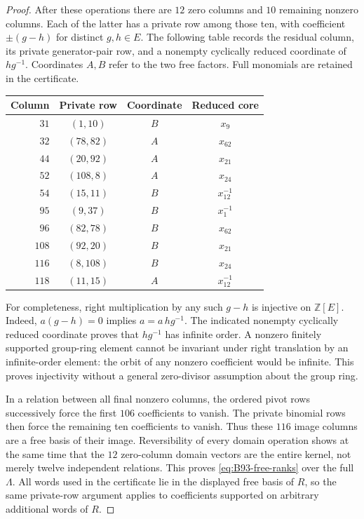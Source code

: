 \begin{proof}
After these operations there are $12$ zero columns and $10$
remaining nonzero columns. Each of the latter has a private row
among those ten, with coefficient $\pm(g-h)$ for distinct
$g,h\in E$. The following table records the residual column,
its private generator-pair row, and a nonempty cyclically reduced
coordinate of $hg^{-1}$. Coordinates $A,B$ refer to the two
free factors. Full monomials are retained in the certificate.
\begin{center}
\begin{tabular}{rccc}
Column&Private row&Coordinate&Reduced core\\\hline
$31$&$(1,10)$&$B$&$x_9$\\
$32$&$(78,82)$&$A$&$x_{62}$\\
$44$&$(20,92)$&$A$&$x_{21}$\\
$52$&$(108,8)$&$A$&$x_{24}$\\
$54$&$(15,11)$&$B$&$x_{12}^{-1}$\\
$95$&$(9,37)$&$B$&$x_1^{-1}$\\
$96$&$(82,78)$&$B$&$x_{62}$\\
$108$&$(92,20)$&$B$&$x_{21}$\\
$116$&$(8,108)$&$B$&$x_{24}$\\
$118$&$(11,15)$&$A$&$x_{12}^{-1}$
\end{tabular}
\end{center}
For completeness, right multiplication by any such $g-h$ is
injective on $\mathbb Z[E]$. Indeed, $a(g-h)=0$ implies
$a=a\,hg^{-1}$. The indicated nonempty cyclically reduced
coordinate proves that $hg^{-1}$ has infinite order. A nonzero
finitely supported group-ring element cannot be invariant under
right translation by an infinite-order element: the orbit of any
nonzero coefficient would be infinite. This proves injectivity
without a general zero-divisor assumption about the group ring.

In a relation between all final nonzero columns, the ordered pivot
rows successively force the first $106$ coefficients to vanish.
The private binomial rows then force the remaining ten coefficients
to vanish. Thus these $116$ image columns are a free basis of their
image. Reversibility of every domain operation shows at the same
time that the $12$ zero-column domain vectors are the entire
kernel, not merely twelve independent relations. This proves
\eqref{eq:B93-free-ranks} over the full $\Lambda$. All words used
in the certificate lie in the displayed free basis of $R$, so the
same private-row argument applies to coefficients supported on
arbitrary additional words of $R$.


\end{proof}
